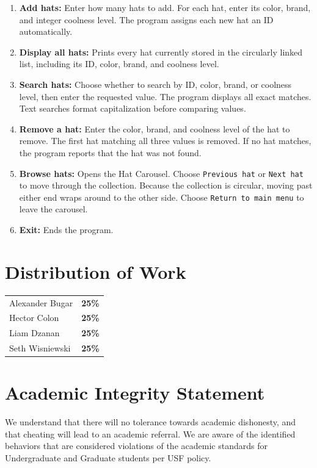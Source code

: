 \documentclass[11pt,letterpaper]{article}
\begin{document}
\begin{enumerate}
    \item \textbf{Add hats:} Enter how many hats to add. For each hat, enter its color, brand, and integer coolness level. The program assigns each new hat an ID automatically.

    \item \textbf{Display all hats:} Prints every hat currently stored in the circularly linked list, including its ID, color, brand, and coolness level.

    \item \textbf{Search hats:} Choose whether to search by ID, color, brand, or coolness level, then enter the requested value. The program displays all exact matches. Text searches format capitalization before comparing values.

    \item \textbf{Remove a hat:} Enter the color, brand, and coolness level of the hat to remove. The first hat matching all three values is removed. If no hat matches, the program reports that the hat was not found.

    \item \textbf{Browse hats:} Opens the Hat Carousel. Choose \texttt{Previous hat} or \texttt{Next hat} to move through the collection. Because the collection is circular, moving past either end wraps around to the other side. Choose \texttt{Return to main menu} to leave the carousel.

    \item \textbf{Exit:} Ends the program.
\end{enumerate}

\section*{Distribution of Work}
\begin{tabular}{@{}ll@{}}
    Alexander Bugar & \textbf{25\%} \\
    Hector Colon & \textbf{25\%} \\
    Liam Dzanan & \textbf{25\%} \\
    Seth Wisniewski & \textbf{25\%}
\end{tabular}

\section*{Academic Integrity Statement}
We understand that there will no tolerance towards academic dishonesty, and that cheating will lead to an academic referral. We are aware of the identified behaviors that are considered violations of the academic standards for Undergraduate and Graduate students per USF policy.
\end{document}
